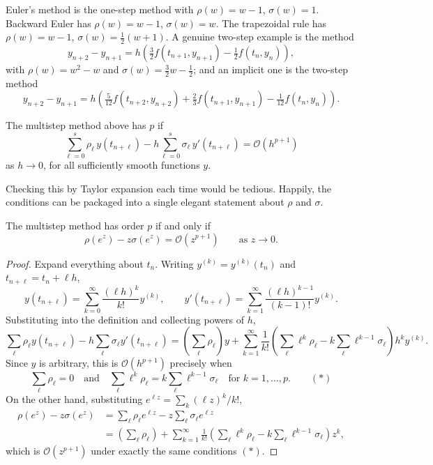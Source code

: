 \documentclass[a4paper]{scrartcl}
\begin{document}
\begin{example}
  Euler's method is the one-step method with $\rho(w) = w - 1$, $\sigma(w) = 1$. Backward Euler has $\rho(w) = w-1$, $\sigma(w) = w$. The trapezoidal rule has $\rho(w) = w - 1$, $\sigma(w) = \tfrac12(w+1)$. A genuine two-step example is the  method
  $$
  y_{n+2} - y_{n+1} = h\left(\tfrac32 f(t_{n+1},y_{n+1}) - \tfrac12 f(t_n, y_n)\right),
  $$
  with $\rho(w) = w^2 - w$ and $\sigma(w) = \tfrac32 w - \tfrac12$; and an implicit one is the two-step  method
  $$
  y_{n+2} - y_{n+1} = h\left(\tfrac{5}{12}f(t_{n+2},y_{n+2}) + \tfrac23 f(t_{n+1},y_{n+1}) - \tfrac1{12}f(t_n,y_n)\right).
  $$
\end{example}

\begin{definition}
  The multistep method above has  $p$ if
  $$
  \sum_{\ell=0}^s \rho_\ell\, y(t_{n+\ell}) - h\sum_{\ell=0}^s \sigma_\ell\, y'(t_{n+\ell}) = \mathcal{O}(h^{p+1})
  $$
  as $h \to 0$, for all sufficiently smooth functions $y$.
\end{definition}

Checking this by Taylor expansion each time would be tedious. Happily, the conditions can be packaged into a single elegant statement about $\rho$ and $\sigma$.

\begin{theorem}\label{thm:ordercond}
  The multistep method has order $p$ if and only if
  $$
  \rho(e^z) - z\sigma(e^z) = \mathcal{O}(z^{p+1}) \qquad \text{as } z \to 0.
  $$
\end{theorem}
\begin{proof}
  Expand everything about $t_n$. Writing $y^{(k)} = y^{(k)}(t_n)$ and $t_{n+\ell} = t_n + \ell h$,
  $$
  y(t_{n+\ell}) = \sum_{k=0}^\infty \frac{(\ell h)^k}{k!}y^{(k)}, \qquad y'(t_{n+\ell}) = \sum_{k=1}^\infty \frac{(\ell h)^{k-1}}{(k-1)!}y^{(k)} .
  $$
  Substituting into the definition and collecting powers of $h$,
  $$
  \sum_{\ell}\rho_\ell y(t_{n+\ell}) - h\sum_\ell \sigma_\ell y'(t_{n+\ell}) = \left(\sum_\ell \rho_\ell\right)y + \sum_{k=1}^\infty \frac{1}{k!}\left(\sum_\ell \ell^k \rho_\ell - k\sum_\ell \ell^{k-1}\sigma_\ell\right)h^k y^{(k)}.
  $$
  Since $y$ is arbitrary, this is $\mathcal{O}(h^{p+1})$ precisely when
  $$
  \sum_\ell \rho_\ell = 0 \quad\text{and}\quad \sum_\ell \ell^k \rho_\ell = k\sum_\ell \ell^{k-1}\sigma_\ell \quad \text{for } k = 1, \dots, p. \qquad (\ast)
  $$
  On the other hand, substituting $e^{\ell z} = \sum_k (\ell z)^k / k!$,
  \begin{align*}
  \rho(e^z) - z\sigma(e^z) &= \sum_\ell \rho_\ell e^{\ell z} - z\sum_\ell \sigma_\ell e^{\ell z}\\
  &= \left(\sum_\ell\rho_\ell\right) + \sum_{k=1}^\infty \frac{1}{k!}\left(\sum_\ell \ell^k\rho_\ell - k\sum_\ell \ell^{k-1}\sigma_\ell\right)z^k,
  \end{align*}
  which is $\mathcal{O}(z^{p+1})$ under exactly the same conditions $(\ast)$.
\end{proof}
\end{document}
